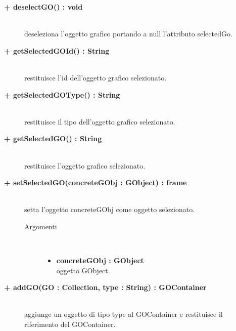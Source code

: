 \begin{description}
\begin{description}
		\item[\textbf{\color{blue}+ deselectGO() : void			}] \hfill \\
			deseleziona l'oggetto grafico portando a null l'attributo selectedGo. 
\end{description}

\begin{description}
		\item[\textbf{\color{blue}+ getSelectedGOId() : String			}] \hfill \\
			restituisce l'id dell'oggetto grafico selezionato.
\end{description}

\begin{description}
		\item[\textbf{\color{blue}+ getSelectedGOType() : String			}] \hfill \\
			restituisce il tipo dell'oggetto grafico selezionato.
\end{description}

\begin{description}
		\item[\textbf{\color{blue}+ getSelectedGO() : String			}] \hfill \\
			restituisce l'oggetto grafico selezionato.
\end{description}

\begin{description}
		\item[\textbf{\color{blue}+ setSelectedGO(concreteGObj : GObject) : frame			}] \hfill \\
			setta l'oggetto concreteGObj come oggetto selezionato.  

\begin{description}
			\item[Argomenti] \hfill \\
				\begin{itemize}
						\item \textbf{concreteGObj : GObject			} \hfill \\
					oggetto GObject.
				\end{itemize}

\end{description}

\end{description}

\begin{description}
		\item[\textbf{\color{blue}+ addGO(GO : Collection, type : String) : GOContainer			}] \hfill \\
			aggiunge un oggetto di tipo type al GOContainer e restituisce il riferimento del GOContainer.  


\end{description}
\end{description}
